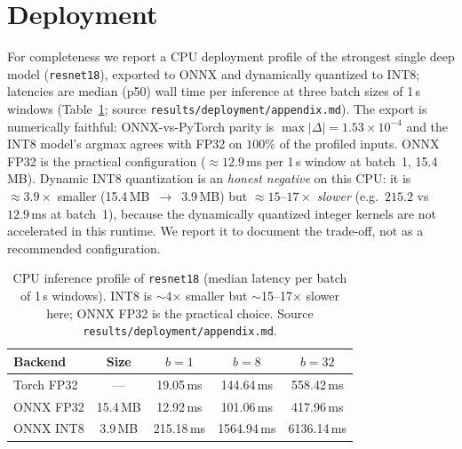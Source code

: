 \documentclass{article}
\newcommand{\code}[1]{\nolinkurl{#1}}
\begin{document}



\appendix
\section{Deployment}
\label{app:deployment}
For completeness we report a CPU deployment profile of the strongest single deep
model (\code{resnet18}), exported to ONNX and dynamically quantized to INT8;
latencies are median (p50) wall time per inference at three batch sizes of 1\,s
windows (Table~\ref{tab:deploy}; source \code{results/deployment/appendix.md}).
The export is numerically faithful: ONNX-vs-PyTorch parity is
$\max|\Delta|=1.53\times10^{-4}$ and the INT8 model's argmax agrees with FP32 on
$100\%$ of the profiled inputs. ONNX FP32 is the practical configuration
(${\approx}12.9$\,ms per 1\,s window at batch~1, 15.4\,MB). Dynamic INT8
quantization is an \emph{honest negative} on this CPU: it is ${\approx}3.9\times$
smaller (15.4\,MB~$\rightarrow$~3.9\,MB) but ${\approx}15$--$17\times$
\emph{slower} (e.g.\ $215.2$ vs $12.9$\,ms at batch~1), because the dynamically
quantized integer kernels are not accelerated in this runtime. We report it to
document the trade-off, not as a recommended configuration.

\begin{table}[h]
  \centering
  \caption{CPU inference profile of \code{resnet18} (median latency per batch of
    1\,s windows). INT8 is $\sim$4$\times$ smaller but $\sim$15--17$\times$ slower
    here; ONNX FP32 is the practical choice. Source
    \code{results/deployment/appendix.md}.}
  \label{tab:deploy}
  \begin{tabular}{lcccc}
    \toprule
    Backend & Size & $b{=}1$ & $b{=}8$ & $b{=}32$ \\
    \midrule
    Torch FP32 & ---      & 19.05\,ms  & 144.64\,ms  & 558.42\,ms \\
    ONNX FP32  & 15.4\,MB & 12.92\,ms  & 101.06\,ms  & 417.96\,ms \\
    ONNX INT8  & 3.9\,MB  & 215.18\,ms & 1564.94\,ms & 6136.14\,ms \\
    \bottomrule
  \end{tabular}
\end{table}
\end{document}
